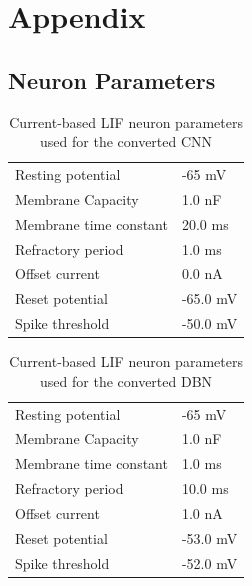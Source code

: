 \chapter{Appendix }

\section{Neuron Parameters}

\begin{table}[h!]
\caption{Current-based LIF neuron parameters used for the converted CNN}
\centering
\label{cnnlifparam}
\begin{tabularx}{0.65\textwidth}{|XX|}
\hline
Resting potential    		& -65 mV 		    \\
Membrane Capacity    		& 1.0 nF 		     \\
Membrane time constant    	& 20.0 ms		             \\
Refractory period     		& 1.0 ms		                 \\
Offset current    			& 0.0 nA		              \\
Reset potential     		& -65.0 mV 	               \\
Spike threshold     		& -50.0 mV          \\\hline
\end{tabularx}
\end{table}

\begin{table}[h!]
\caption{Current-based LIF neuron parameters used for the converted DBN}
\centering
\label{cubalifparam}
\begin{tabularx}{0.65\textwidth}{|XX|}
\hline
Resting potential    		& -65 mV 		    \\
Membrane Capacity    		& 1.0 nF 		     \\
Membrane time constant    	& 1.0 ms		             \\
Refractory period     		& 10.0 ms		                 \\
Offset current    			& 1.0 nA		              \\
Reset potential     		& -53.0 mV 	               \\
Spike threshold     		& -52.0 mV          \\\hline
\end{tabularx}
\end{table}


